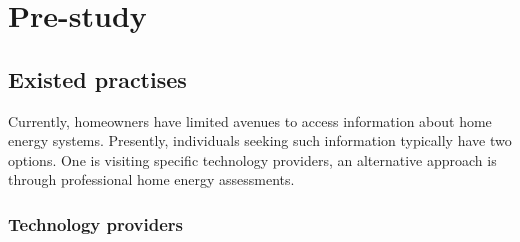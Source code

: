 \chapter{Pre-study} 






\section{Existed practises}

Currently, homeowners have limited avenues to access information about home energy systems. 
Presently, individuals seeking such information typically have two options. 
One is visiting specific technology providers, 
an alternative approach is through professional home energy assessments. 


\subsection{Technology providers}

